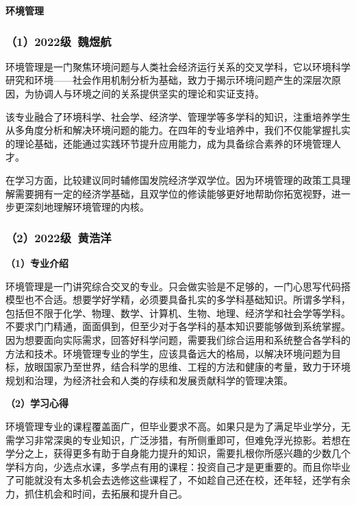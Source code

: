 \documentclass[11pt,oneside]{book}
\begin{document}
\vspace{10pt}

\textbf{环境管理}

\subsubsection{（1）2022级\ 魏煜航}

环境管理是一门聚焦环境问题与人类社会经济运行关系的交叉学科，它以环境科学研究和环境——社会作用机制分析为基础，致力于揭示环境问题产生的深层次原因，为协调人与环境之间的关系提供坚实的理论和实证支持。

\vspace{10pt}

该专业融合了环境科学、社会学、经济学、管理学等多学科的知识，注重培养学生从多角度分析和解决环境问题的能力。在四年的专业培养中，我们不仅能掌握扎实的理论基础，还能通过实践环节提升应用能力，成为具备综合素养的环境管理人才。

\vspace{10pt}

在学习方面，比较建议同时辅修国发院经济学双学位。因为环境管理的政策工具理解需要拥有一定的经济学基础，且双学位的修读能够更好地帮助你拓宽视野，进一步更深刻地理解环境管理的内核。

\subsubsection{（2）2022级\ 黄浩洋}

\textbf{（1）专业介绍}

环境管理是一门讲究综合交叉的专业。只会做实验是不足够的，一门心思写代码搭模型也不合适。想要学好学精，必须要具备扎实的多学科基础知识。所谓多学科，包括但不限于化学、物理、数学、计算机、生物、地理、经济学和社会学等学科。不要求门门精通，面面俱到，但至少对于各学科的基本知识要能够做到系统掌握。因为想要面向实际需求，回答好科学问题，需要我们综合运用和系统整合各学科的方法和技术。环境管理专业的学生，应该具备远大的格局，以解决环境问题为目标，放眼国家乃至世界，结合科学的思维、工程的方法和健康的考量，致力于环境规划和治理，为经济社会和人类的存续和发展贡献科学的管理决策。

\vspace{10pt}

\textbf{（2）学习心得}

环境管理专业的课程覆盖面广，但毕业要求不高。如果只是为了满足毕业学分，无需学习非常深奥的专业知识，广泛涉猎，有所侧重即可，但难免浮光掠影。若想在学分之上，获得更多有助于自身能力提升的知识，需要扎根你所感兴趣的少数几个学科方向，少选点水课，多学点有用的课程：投资自己才是更重要的。而且你毕业了可能就没有太多机会去选修这些课程了，不如趁自己还在校，还年轻，还学有余力，抓住机会和时间，去拓展和提升自己。
\end{document}

